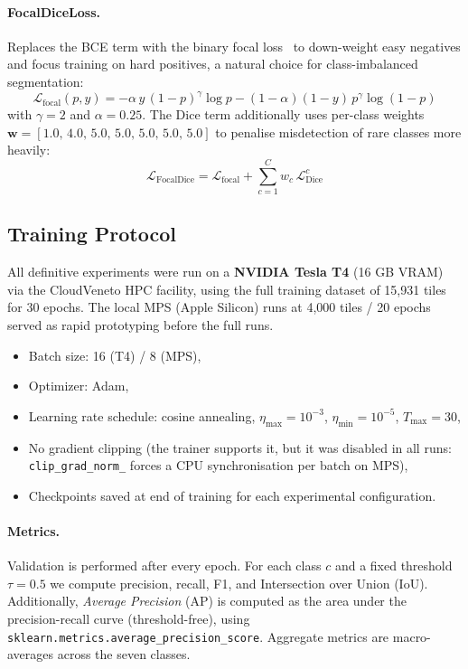 \documentclass{aa}
\begin{document}
\paragraph{FocalDiceLoss.}
Replaces the BCE term with the binary focal loss~\cite{lin2017focal} to down-weight easy negatives and focus training on hard positives, a natural choice for class-imbalanced segmentation:
\[
\mathcal{L}_{\text{focal}}(p,y) = -\alpha\,y\,(1-p)^\gamma \log p
                                   -(1-\alpha)(1-y)\,p^\gamma \log(1-p)
\]
with $\gamma=2$ and $\alpha=0.25$. The Dice term additionally uses per-class weights $\mathbf{w} = [1.0,\,4.0,\,5.0,\,5.0,\,5.0,\,5.0,\,5.0]$ to penalise misdetection of rare classes more heavily:
\[
\mathcal{L}_{\text{FocalDice}} = \mathcal{L}_{\text{focal}} + \sum_{c=1}^{C} w_c \,\mathcal{L}_{\text{Dice}}^c
\]

\subsection{Training Protocol}
\label{sec:mr_training}

All definitive experiments were run on a \textbf{NVIDIA Tesla T4} (16 GB VRAM) via the CloudVeneto HPC facility, using the full training dataset of 15{,}931 tiles for 30 epochs. The local MPS (Apple Silicon) runs at 4{,}000 tiles / 20 epochs served as rapid prototyping before the full runs.

\begin{itemize}
    \item Batch size: 16 (T4) / 8 (MPS),
    \item Optimizer: Adam,
    \item Learning rate schedule: cosine annealing, $\eta_{\max}=10^{-3}$, $\eta_{\min}=10^{-5}$, $T_{\max}=30$,
    \item No gradient clipping (the trainer supports it, but it was disabled in all runs: \texttt{clip\_grad\_norm\_} forces a CPU synchronisation per batch on MPS),
    \item Checkpoints saved at end of training for each experimental configuration.
\end{itemize}

\paragraph{Metrics.}
Validation is performed after every epoch. For each class $c$ and a fixed threshold $\tau=0.5$ we compute precision, recall, F1, and Intersection over Union (IoU). Additionally, \textit{Average Precision} (AP) is computed as the area under the precision-recall curve (threshold-free), using \texttt{sklearn.metrics.average\_precision\_score}. Aggregate metrics are macro-averages across the seven classes.
\end{document}
